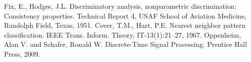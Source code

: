 \documentclass[conference]{IEEEtran}
\begin{document}
\begin{thebibliography}{00}
 Fix, E., Hodges, J.L. Discriminatory analysis, nonparametric discrimination: Consistency properties. Technical Report 4, USAF School of Aviation Medicine, Randolph Field, Texas, 1951.
 Cover, T.M., Hart, P.E. Nearest neighbor pattern classification. IEEE Trans. Inform. Theory, IT-13(1):21–27, 1967.
 Oppenheim, Alan V. and Schafer, Ronald W. Discrete-Time Signal Processing. Prentice Hall Press, 2009.
\end{thebibliography}
\end{document}
